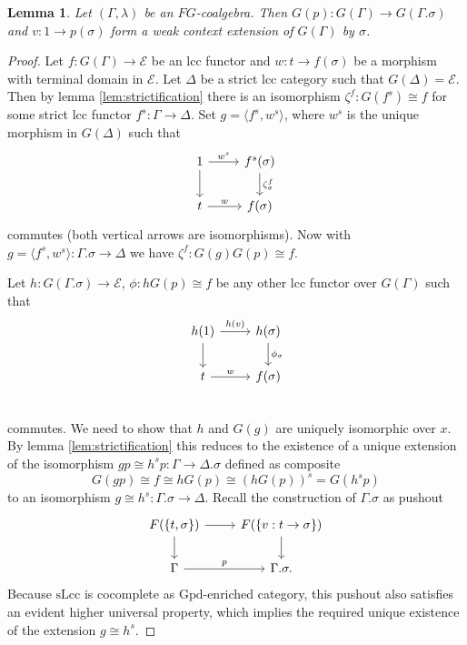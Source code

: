 \documentclass{article}
\newtheorem{lemma}{Lemma}
\theoremstyle{remark}
\theoremstyle{definition}
\begin{document}
\begin{lemma}
  \label{lem:strict-ext-is-weak-ext}
  Let $(\Gamma, \lambda)$ be an $FG$-coalgebra.
  Then $G(p) : G(\Gamma) \rightarrow G(\Gamma.\sigma)$ and $v : 1 \rightarrow p(\sigma)$ form a weak context extension of $G(\Gamma)$ by $\sigma$.
\end{lemma}
\begin{proof}
  Let $f : G(\Gamma) \rightarrow \mathcal{E}$ be an lcc functor and $w : t \rightarrow  f(\sigma)$ be a morphism with terminal domain in $\mathcal{E}$.
  Let $\Delta$ be a strict lcc category such that $G(\Delta) = \mathcal{E}$.
  Then by lemma \ref{lem:strictification} there is an isomorphism $\zeta^f : G(f^s) \cong f$ for some strict lcc functor $f^s : \Gamma \rightarrow \Delta$.
  Set $g = \langle f^s, w^s \rangle$, where $w^s$ is the unique morphism in $G(\Delta)$ such that
  \begin{equation}
    \begin{tikzcd}
      1 \arrow[d] \arrow[r, "w^s"] & f^s(\sigma) \arrow[d, "\zeta^f_\sigma"] \\
      t \arrow[r, "w"] & f(\sigma)
    \end{tikzcd}
  \end{equation}
  commutes (both vertical arrows are isomorphisms).
  Now with $g = \langle f^s, w^s \rangle : \Gamma.\sigma \rightarrow \Delta$ we have $\zeta^f : G(g) G(p) \cong f$.

  Let $h : G(\Gamma.\sigma) \rightarrow \mathcal{E}$, $\phi : h G(p) \cong f$ be any other lcc functor over $G(\Gamma)$ such that
  \begin{equation}
    \begin{tikzcd}
      h(1) \arrow[d] \arrow[r, "h(v)"] & h(\sigma) \arrow[d, "\phi_\sigma"] \\
      t \arrow[r, "w"] & f(\sigma) \\
    \end{tikzcd}
  \end{equation}
  commutes.
  We need to show that $h$ and $G(g)$ are uniquely isomorphic over $x$.
  By lemma \ref{lem:strictification} this reduces to the existence of a unique extension of the isomorphism $g p \cong h^s p : \Gamma \rightarrow \Delta.\sigma$ defined as composite
  \begin{equation}
    G(gp) \cong f \cong h G(p) \cong (h G(p))^s = G(h^s p)
  \end{equation}
  to an isomorphism $g \cong h^s : \Gamma.\sigma \rightarrow \Delta$.
  Recall the construction of $\Gamma.\sigma$ as pushout
  \begin{equation}
    \begin{tikzcd}
      F(\{ t, \sigma \}) \arrow[d] \arrow[r] & F(\{ v : t \rightarrow \sigma \}) \arrow[d] \\
      \Gamma \arrow[r, "p"] & \Gamma.\sigma.
    \end{tikzcd}
  \end{equation}
  Because $\mathrm{sLcc}$ is cocomplete as $\mathrm{Gpd}$-enriched category, this pushout also satisfies an evident higher universal property, which implies the required unique existence of the extension $g \cong h^s$.
\end{proof}
\end{document}
